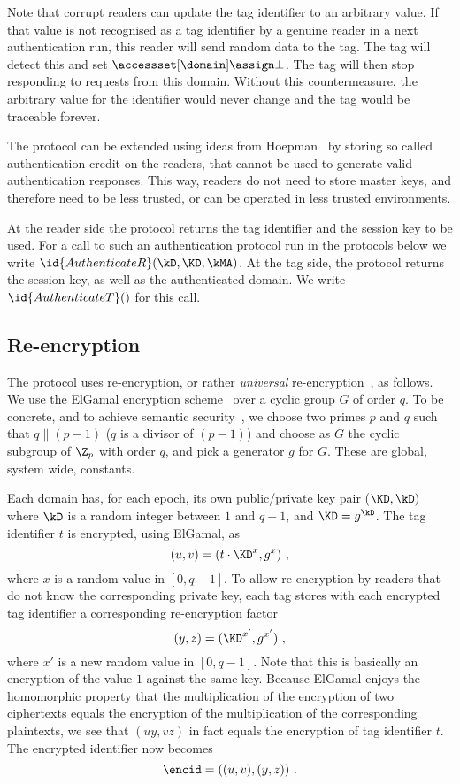 Note that corrupt readers can update the tag identifier to an arbitrary
value. If that value is not recognised as a tag identifier by a genuine reader
in a next authentication run, this reader will send random data to the tag. The
tag will detect this and set 
$\accessset[\domain] \assign \bot$. The tag will then stop responding to
requests from this domain. 
Without this countermeasure, the arbitrary value for the identifier would never
change and the tag would be traceable forever.


The protocol can be extended using ideas from Hoepman~\etal\cite{Hoe00} by
storing so called authentication credit on the readers, that cannot be used to
generate valid authentication responses. This way, readers do not need to store
master keys, and therefore need to be less trust\-ed, or can be operated in less
trusted environments.

At the reader side the protocol returns the tag identifier and the
session key to be used.
For a call to such an
authentication protocol run in the protocols below
we write
$\id{AuthenticateR}(\kD,\KD,\kMA)$.
At the tag side, the protocol returns the session key, as well as 
the authenticated domain.
We write $\id{AuthenticateT}()$ for this call.

\subsection{Re-encryption}
\label{ssec-reencrypt}

The protocol uses re-encryption, or rather \emph{universal}
re-encryption~\cite{golle2004reencryption}, as follows. 
We use the ElGamal encryption scheme~\cite{DBLP:journals/tit/Elgamal85}
over a cyclic group $G$ of order $q$.
To be
concrete, and to achieve semantic security~\cite{DBLP:conf/pkc/TsiounisY98}, we
choose two primes $p$ and $q$ such that $q \| (p-1)$ (\ie $q$ is a divisor of
$(p-1)$) and choose as $G$ the cyclic subgroup of $\Z_p$ with order $q$, and 
pick a generator $g$ for $G$. These are global, system wide, constants.



Each domain has, for each epoch, its own public/pri\-vate key pair ($\KD,\kD)$
where $\kD$ is a random integer between $1$ and $q-1$, and $\KD = g^\kD$.
The tag identifier $t$ is encrypted, using ElGamal, as
\[
(u,v) = (t \cdot \KD^x, g^x)~,
\]
where $x$ is a random value in $[0,q-1]$. 
To allow re-encryption by readers that do not know the corresponding private
key, each tag stores with each encrypted tag identifier a corresponding
re-encryption factor
\[
(y,z) =  (\KD^{x'}, g^{x'})~,
\]
where $x'$ is a new random value in $[0,q-1]$. 
Note that this is basically an encryption of
the value $1$ against the same key. Because ElGamal enjoys the homomorphic
property that the multiplication of the encryption of two ciphertexts equals
the encryption of the multiplication of the corresponding plaintexts, we see
that $(uy,vz)$ in fact equals the encryption of tag identifier $t$.
The encrypted identifier now becomes
\[
\encid = ((u,v),(y,z))~.
\]

